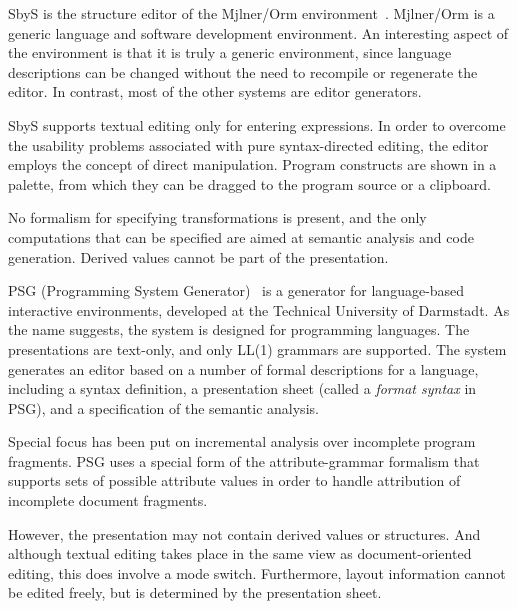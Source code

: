 \documentclass{entcs}
\begin{document}

SbyS is the structure editor of the Mj\slasho lner/Orm environment~\cite{magnusson90orm}. Mj\slasho lner/Orm is a generic language and software development environment. An interesting aspect of the environment is that it is truly a generic environment, since language descriptions can be changed without the need to recompile or regenerate the editor. In contrast, most of the other systems are editor generators.

SbyS supports textual editing only for entering expressions. In order to overcome the usability problems associated with pure syntax-directed editing, the editor employs the concept of direct manipulation. Program constructs are shown in a palette, from which they can be dragged to the program source or a clipboard.

No formalism for specifying transformations is present, and the only computations that can be specified are aimed at semantic analysis and code generation. Derived values cannot be part of the presentation.



PSG (Programming System Generator)~\cite{Bahlke86PSG} is a generator for language-based interactive environments, developed at the Technical University of Darmstadt. As the name suggests, the system is designed for programming languages. The presentations are text-only, and only LL(1) grammars are supported. The system generates an editor based on a number of formal descriptions for a language, including a syntax definition, a presentation sheet (called a {\em format syntax} in PSG), and a specification of the semantic analysis.

Special focus has been put on incremental analysis over incomplete program fragments. PSG uses a special form of the attribute-grammar formalism that supports sets of possible attribute values in order to handle attribution of incomplete document fragments.

However, the presentation may not contain derived values or structures. And although textual editing takes place in the same view as document-oriented editing, this does involve a mode switch. Furthermore, layout information cannot be edited freely, but is determined by the presentation sheet.

\end{document}
